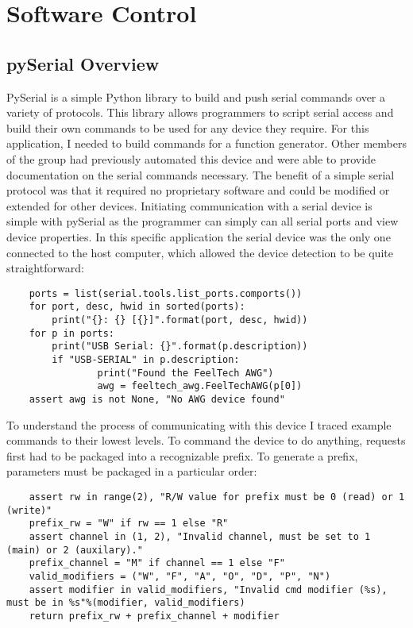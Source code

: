 \section{Software Control}
\subsection{pySerial Overview}
PySerial is a simple Python library to build and push serial commands over a variety of protocols. This library allows programmers to script serial access and build their own commands to be used for any device they require. For this application, I needed to build commands for a function generator. Other members of the group had previously automated this device and were able to provide documentation on the serial commands necessary. The benefit of a simple serial protocol was that it required no proprietary software and could be modified or extended for other devices. Initiating communication with a serial device is simple with pySerial as the programmer can simply can all serial ports and view device properties. In this specific application the serial device was the only one connected to the host computer, which allowed the device detection to be quite straightforward:\par
\begin{lstlisting}
	ports = list(serial.tools.list_ports.comports())
	for port, desc, hwid in sorted(ports):
		print("{}: {} [{}]".format(port, desc, hwid))
	for p in ports:
		print("USB Serial: {}".format(p.description))
		if "USB-SERIAL" in p.description:
				print("Found the FeelTech AWG")
				awg = feeltech_awg.FeelTechAWG(p[0])
	assert awg is not None, "No AWG device found"
\end{lstlisting}
To understand the process of communicating with this device I traced example commands to their lowest levels. To command the device to do anything, requests first had to be packaged into a recognizable prefix. To generate a prefix, parameters must be packaged in a particular order: \par
\begin{lstlisting}
	assert rw in range(2), "R/W value for prefix must be 0 (read) or 1 (write)"
	prefix_rw = "W" if rw == 1 else "R"
	assert channel in (1, 2), "Invalid channel, must be set to 1 (main) or 2 (auxilary)."
	prefix_channel = "M" if channel == 1 else "F"
	valid_modifiers = ("W", "F", "A", "O", "D", "P", "N")
	assert modifier in valid_modifiers, "Invalid cmd modifier (%s), must be in %s"%(modifier, valid_modifiers)
	return prefix_rw + prefix_channel + modifier
\end{lstlisting}
